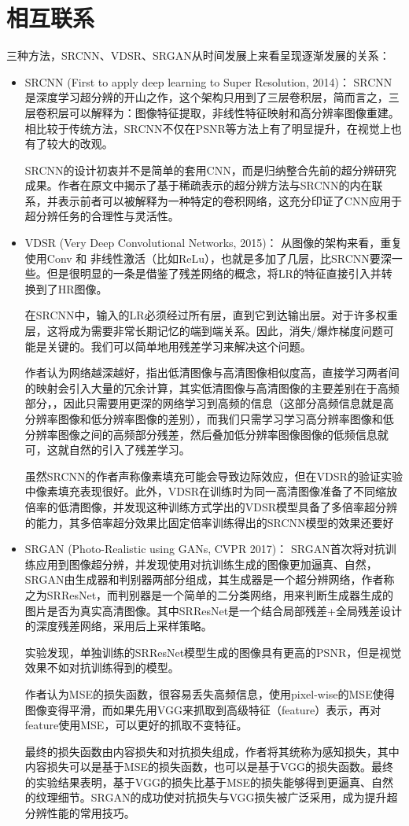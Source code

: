 \documentclass[UTF8,a4paper,10pt]{ctexrep}
\begin{document}
\chapter{相互联系}
三种方法，SRCNN、VDSR、SRGAN从时间发展上来看呈现逐渐发展的关系：
\begin{itemize}
  \item SRCNN (First to apply deep learning to Super Resolution, 2014)：
        SRCNN是深度学习超分辨的开山之作，这个架构只用到了三层卷积层，简而言之，三层卷积层可以解释为：图像特征提取，非线性特征映射和高分辨率图像重建。相比较于传统方法，SRCNN不仅在PSNR等方法上有了明显提升，在视觉上也有了较大的改观。

        SRCNN的设计初衷并不是简单的套用CNN，而是归纳整合先前的超分辨研究成果。作者在原文中揭示了基于稀疏表示的超分辨方法与SRCNN的内在联系，并表示前者可以被解释为一种特定的卷积网络，这充分印证了CNN应用于超分辨任务的合理性与灵活性。
  \item VDSR (Very Deep Convolutional Networks, 2015)：
        从图像的架构来看，重复使用Conv 和 非线性激活（比如ReLu），也就是多加了几层，比SRCNN要深一些。但是很明显的一条是借鉴了残差网络的概念，将LR的特征直接引入并转换到了HR图像。

        在SRCNN中，输入的LR必须经过所有层，直到它到达输出层。对于许多权重层，这将成为需要非常长期记忆的端到端关系。因此，消失/爆炸梯度问题可能是关键的。我们可以简单地用残差学习来解决这个问题。

        作者认为网络越深越好，指出低清图像与高清图像相似度高，直接学习两者间的映射会引入大量的冗余计算，其实低清图像与高清图像的主要差别在于高频部分，，因此只需要用更深的网络学习到高频的信息（这部分高频信息就是高分辨率图像和低分辨率图像的差别），而我们只需学习学习高分辨率图像和低分辨率图像之间的高频部分残差，然后叠加低分辨率图像图像的低频信息就可，这就自然的引入了残差学习。

        虽然SRCNN的作者声称像素填充可能会导致边际效应，但在VDSR的验证实验中像素填充表现很好。此外，VDSR在训练时为同一高清图像准备了不同缩放倍率的低清图像，并发现这种训练方式学出的VDSR模型具备了多倍率超分辨的能力，其多倍率超分效果比固定倍率训练得出的SRCNN模型的效果还要好
  \item SRGAN (Photo-Realistic using GANs, CVPR 2017)：
        SRGAN首次将对抗训练应用到图像超分辨，并发现使用对抗训练生成的图像更加逼真、自然，SRGAN由生成器和判别器两部分组成，其生成器是一个超分辨网络，作者称之为SRResNet，而判别器是一个简单的二分类网络，用来判断生成器生成的图片是否为真实高清图像。其中SRResNet是一个结合局部残差+全局残差设计的深度残差网络，采用后上采样策略。

        实验发现，单独训练的SRResNet模型生成的图像具有更高的PSNR，但是视觉效果不如对抗训练得到的模型。

        作者认为MSE的损失函数，很容易丢失高频信息，使用pixel-wise的MSE使得图像变得平滑，而如果先用VGG来抓取到高级特征（feature）表示，再对feature使用MSE，可以更好的抓取不变特征。

        最终的损失函数由内容损失和对抗损失组成，作者将其统称为感知损失，其中内容损失可以是基于MSE的损失函数，也可以是基于VGG的损失函数。最终的实验结果表明，基于VGG的损失比基于MSE的损失能够得到更逼真、自然的纹理细节。SRGAN的成功使对抗损失与VGG损失被广泛采用，成为提升超分辨性能的常用技巧。
\end{itemize}

% 
% 
\end{document}
